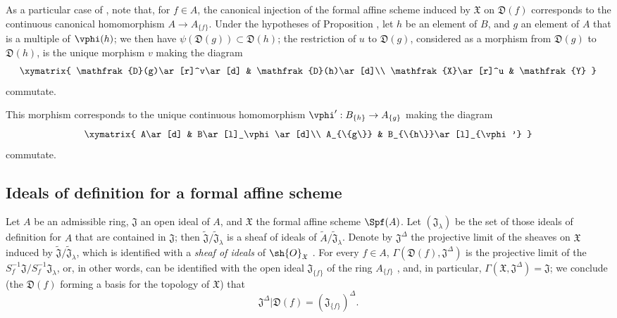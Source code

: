\begin{env}[10.2.3]
\label{I.10.2.3}
As a particular case of , note that, for $f\in A$, the canonical injection of the formal affine scheme induced by $\mathfrak{X}$ on $\mathfrak{D}(f)$ corresponds to the continuous canonical homomorphism $A\to A_{\{f\}}$.
Under the hypotheses of Proposition , let $h$ be an element of $B$, and $g$ an element of $A$ that is a multiple of $\vphi(h)$;
we then have $\psi(\mathfrak{D}(g))\subset\mathfrak{D}(h)$; the restriction of $u$ to $\mathfrak{D}(g)$, considered as a morphism from $\mathfrak{D}(g)$ to $\mathfrak{D}(h)$, is the unique morphism $v$ making the diagram
\[
  \xymatrix{
    \mathfrak{D}(g)\ar[r]^v\ar[d] &
    \mathfrak{D}(h)\ar[d]\\
    \mathfrak{X}\ar[r]^u &
    \mathfrak{Y}
  }
\]
commutate.

This morphism corresponds to the unique continuous homomorphism $\vphi':B_{\{h\}}\to A_{\{g\}}$  making the diagram
\[
  \xymatrix{
    A\ar[d] &
    B\ar[l]_\vphi\ar[d]\\
    A_{\{g\}} &
    B_{\{h\}}\ar[l]_{\vphi'}
  }
\]
commutate.
\end{env}

\subsection{Ideals of definition for a formal affine scheme}
\label{subsection:I.10.3}

\begin{env}[10.3.1]
\label{I.10.3.1}
Let $A$ be an admissible ring, $\mathfrak{J}$ an open ideal of $A$, and $\mathfrak{X}$ the formal affine scheme $\Spf(A)$.
Let $(\mathfrak{J}_\lambda)$ be the set of those ideals of definition for $A$ that are contained in $\mathfrak{J}$; then $\widetilde{\mathfrak{J}}/\widetilde{\mathfrak{J}}_\lambda$ is a sheaf of ideals of $\widetilde{A}/\widetilde{\mathfrak{J}}_\lambda$.
Denote by $\mathfrak{J}^\Delta$ the projective limit of the sheaves on $\mathfrak{X}$ induced by $\widetilde{\mathfrak{J}}/\widetilde{\mathfrak{J}}_\lambda$, which is identified with a \emph{sheaf of ideals} of $\sh{O}_\mathfrak{X}$ .
For every $f\in A$, $\Gamma(\mathfrak{D}(f),\mathfrak{J}^\Delta)$ is the projective limit of the $S_f^{-1}\mathfrak{J}/S_f^{-1}\mathfrak{J}_\lambda$, or, in other words, can be identified with the open ideal $\mathfrak{J}_{\{f\}}$ of the ring $A_{\{f\}}$ , and, in particular, $\Gamma(\mathfrak{X},\mathfrak{J}^\Delta)=\mathfrak{J}$; we conclude (the $\mathfrak{D}(f)$ forming a basis for the topology of $\mathfrak{X}$) that
\[
\label{I.10.3.1.1}
  \mathfrak{J}^\Delta|\mathfrak{D}(f)=(\mathfrak{J}_{\{f\}})^\Delta.
  \tag{10.3.1.1}
\]
\end{env}

